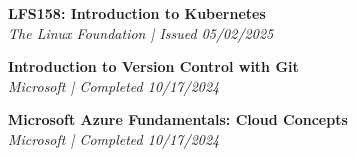 \documentclass[letterpaper,11pt]{article}
\begin{document}
\begin{itemize}[leftmargin=0.15in, label={}]
{{    %
    \item{
        \textbf{LFS158: Introduction to Kubernetes} \\
        \textit{The Linux Foundation | Issued 05/02/2025} \\
    }

    \item{
        \textbf{Introduction to Version Control with Git} \\
        \textit{Microsoft | Completed 10/17/2024} \\
    }
    \item{
        \textbf{Microsoft Azure Fundamentals: Cloud Concepts} \\
        \textit{Microsoft | Completed 10/17/2024} \\
    }
    }
    }
  \end{itemize}
\end{document}
